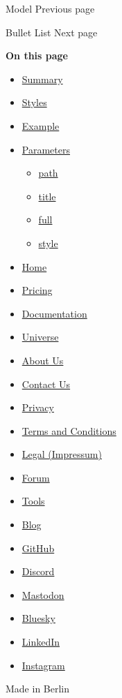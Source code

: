 { Model } { Previous page }

\href{/docs/reference/model/list/}{\pandocbounded{}}

{ Bullet List } { Next page }

\textbf{On this page}

\begin{itemize}
\tightlist
\item
  \hyperref[summary]{Summary}
\item
  \hyperref[styles]{Styles}
\item
  \hyperref[example]{Example}
\item
  \hyperref[parameters]{Parameters}

  \begin{itemize}
  \tightlist
  \item
    \hyperref[parameters-path]{path}
  \item
    \hyperref[parameters-title]{title}
  \item
    \hyperref[parameters-full]{full}
  \item
    \hyperref[parameters-style]{style}
  \end{itemize}
\end{itemize}

\begin{itemize}
\tightlist
\item
  \href{/}{Home}
\item
  \href{/pricing/}{Pricing}
\item
  \href{/docs/}{Documentation}
\item
  \href{/universe/}{Universe}
\item
  \href{/about/}{About Us}
\item
  \href{/contact/}{Contact Us}
\item
  \href{/privacy/}{Privacy}
\item
  \href{https://typst.app/terms}{Terms and Conditions}
\item
  \href{/legal/}{Legal (Impressum)}
\end{itemize}

\begin{itemize}
\tightlist
\item
  \href{https://forum.typst.app}{Forum}
\item
  \href{/tools/}{Tools}
\item
  \href{/blog/}{Blog}
\item
  \href{https://github.com/typst/}{GitHub}
\item
  \href{https://discord.gg/2uDybryKPe}{Discord}
\item
  \href{https://mastodon.social/@typst}{Mastodon}
\item
  \href{https://bsky.app/profile/typst.app}{Bluesky}
\item
  \href{https://www.linkedin.com/company/typst/}{LinkedIn}
\item
  \href{https://instagram.com/typstapp/}{Instagram}
\end{itemize}

Made in Berlin
